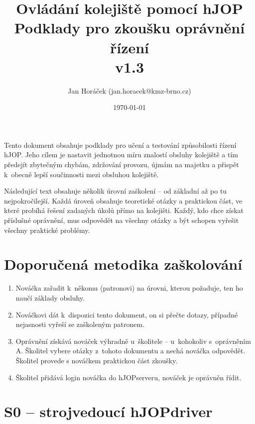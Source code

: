 \documentclass[12pt,a4paper]{article}
\begin{document}
\thispagestyle{empty}

\setlength{\parindent}{0cm}
\setlength{\parskip}{3mm plus2pt minus2pt}

\setlength{\droptitle}{-5em}

\title{
\Large Ovládání kolejiště pomocí hJOP\\
\LARGE Podklady pro zkoušku oprávnění řízení\\
\small v1.3}
\author{Jan Horáček (jan.horacek@kmz-brno.cz)}
\date{\today}
\maketitle

Tento dokument obsahuje podklady pro učení a testování způsobilosti řízení
hJOP. Jeho cílem je nastavit jednotnou míru znalostí obsluhy kolejiště a tím
předejít zbytečným chybám, zdržování provozu, újmám na majetku a přispět
k~obecně lepší součinnosti mezi obsluhou kolejiště.

Následující text obsahuje několik úrovní zaškolení – od základní až po tu
nejpokročilejší. Každá úroveň obsahuje teoretické otázky a praktickou část, ve
které probíhá řešení zadaných úkolů přímo na kolejišti. Každý, kdo chce získat
příslušné oprávnění, mus odpovědět na všechny otázky a být schopen vyřešit
všechny praktické problémy.

\section*{Doporučená metodika zaškolování}

\begin{enumerate}[leftmargin=*]
\item Nováčka zařadit k~někomu (patronovi) na úrovni, kterou požaduje, ten ho
naučí základy obsluhy.
\item Nováčkovi dát k~dispozici tento dokument, on si přečte dotazy, případné
nejasnosti vyřeší se zaškoleným patronem.
\item Oprávnění získává nováček výhradně u~školitele – u~kohokoliv s~oprávněním
A. Školitel vybere otázky z~tohoto dokumentu a nechá nováčka odpovědět. Školitel
provede s nováčkem praktickou část zkoušky.
\item Školitel přidává login nováčka do hJOPserveru, nováček je oprávněn řídit.
\end{enumerate}

\newpage

\section*{S0 – strojvedoucí hJOPdriver}
\end{document}
